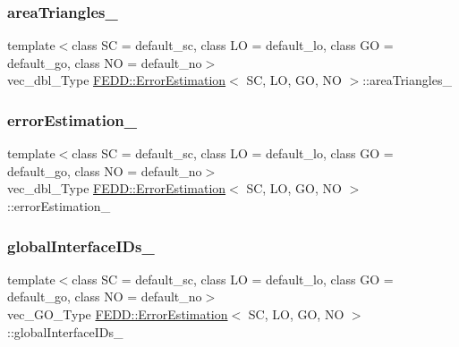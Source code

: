 \subsubsection{\texorpdfstring{area\+Triangles\+\_\+}{areaTriangles\_}}
{\footnotesize\ttfamily template$<$class SC  = default\+\_\+sc, class LO  = default\+\_\+lo, class GO  = default\+\_\+go, class NO  = default\+\_\+no$>$ \\
vec\+\_\+dbl\+\_\+\+Type \hyperlink{classFEDD_1_1ErrorEstimation}{F\+E\+D\+D\+::\+Error\+Estimation}$<$ SC, LO, GO, NO $>$\+::area\+Triangles\+\_\+\hspace{0.3cm}{\ttfamily [protected]}}

\mbox{\label{classFEDD_1_1ErrorEstimation_a477f016c78940297ee1346642dd5fa15}} 
\subsubsection{\texorpdfstring{error\+Estimation\+\_\+}{errorEstimation\_}}
{\footnotesize\ttfamily template$<$class SC  = default\+\_\+sc, class LO  = default\+\_\+lo, class GO  = default\+\_\+go, class NO  = default\+\_\+no$>$ \\
vec\+\_\+dbl\+\_\+\+Type \hyperlink{classFEDD_1_1ErrorEstimation}{F\+E\+D\+D\+::\+Error\+Estimation}$<$ SC, LO, GO, NO $>$\+::error\+Estimation\+\_\+\hspace{0.3cm}{\ttfamily [protected]}}

\mbox{\label{classFEDD_1_1ErrorEstimation_afb6eb1618023286bcbd18b59023752fb}} 
\subsubsection{\texorpdfstring{global\+Interface\+I\+Ds\+\_\+}{globalInterfaceIDs\_}}
{\footnotesize\ttfamily template$<$class SC  = default\+\_\+sc, class LO  = default\+\_\+lo, class GO  = default\+\_\+go, class NO  = default\+\_\+no$>$ \\
vec\+\_\+\+G\+O\+\_\+\+Type \hyperlink{classFEDD_1_1ErrorEstimation}{F\+E\+D\+D\+::\+Error\+Estimation}$<$ SC, LO, GO, NO $>$\+::global\+Interface\+I\+Ds\+\_\+\hspace{0.3cm}{\ttfamily [protected]}}

